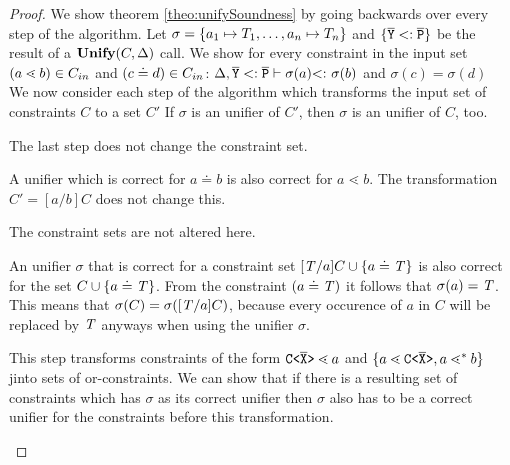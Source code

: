 \begin{proof}
We show theorem \ref{theo:unifySoundness} by going backwards over every step of the algorithm.
Let $\sigma = \{ a_1 \mapsto T_1, \ldots , a_n \mapsto T_n \}$ and $\{ \overline{\tt Y} <: \overline{\tt P} \}$ be the result of a $\textbf{Unify}{}(C, \Delta)$ call.
We show for every constraint in the input set $(a \lessdot b) \in C_{in}$ and $(c \doteq d) \in C_{in}$:
$\Delta, \overline{\tt Y} <: \overline{\tt P} \vdash \sigma(a) \textrm{$<:$}\  \sigma(b)$ and $\sigma(c) = \sigma(d)$\\

We now consider each step of the \unify{} algorithm
which transforms the input set of constraints $C$ to a set $C'$
If $\sigma$ is an unifier of $C'$, then $\sigma$ is an unifier of $C$, too.

\begin{description}

\item[Step 6] The last step does not change the constraint set.
\item[Step 5]
A unifier which is correct for $a \doteq b$ is also correct for $a \lessdot b$.
The transformation $C' = [a/b]C$ does not change this.

\item[Step 4]
The constraint sets are not altered here.

\item[Step 3]
An unifier $\sigma$ that is correct for a constraint set
$[\mathit{T}/a]C \cup \{ a \doteq \mathit{T} \}$ is also correct for
the set $C \cup \{ a \doteq \mathit{T} \}$.
From the constraint $(a \doteq \mathit{T})$ it follows that $\sigma(a) = \mathit{T}$.
This means that $\sigma(C) = \sigma([\mathit{T}/a]C)$,
because every occurence of $a$ in $C$ will be replaced by $\mathit{T}$ anyways when using the unifier $\sigma$.

\item[Step 2]
This step transforms constraints of the form $\mathtt{C \texttt{<} \overline{\tt X} \texttt{>} } \lessdot a$ and
$\{ a \lessdot \mathtt{C \texttt{<} \overline{\tt X} \texttt{>} }, a \lessdot^* b \}$ jinto sets of or-constraints.
We can show that if there is a resulting set of constraints which has $\sigma$ as its correct unifier
then $\sigma$ also has to be a correct unifier for the constraints before this transformation.


\end{description}
\end{proof}
